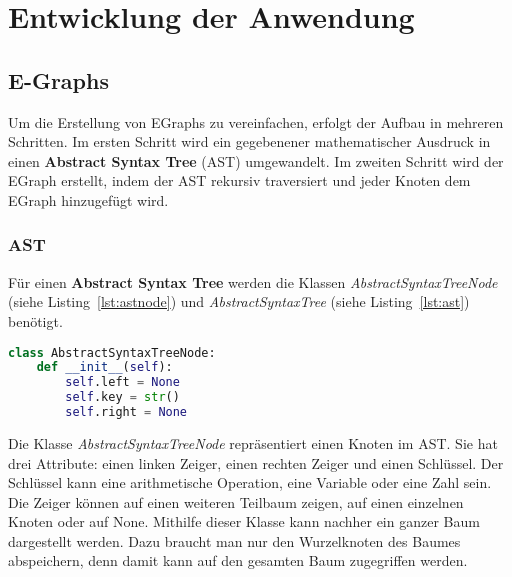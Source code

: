 \section{Entwicklung der Anwendung}\label{sec:entwicklung}

\subsection{E-Graphs}

Um die Erstellung von EGraphs zu vereinfachen, erfolgt der Aufbau in mehreren Schritten.
Im ersten Schritt wird ein gegebenener mathematischer Ausdruck in einen \textbf{Abstract Syntax Tree} (AST) umgewandelt.
Im zweiten Schritt wird der EGraph erstellt, indem der AST rekursiv traversiert und jeder Knoten dem EGraph hinzugefügt wird. 

\subsubsection{AST}

Für einen \textbf{Abstract Syntax Tree} werden die Klassen \textit{AbstractSyntaxTreeNode} (siehe Listing~\ref{lst:astnode}) und 
\textit{AbstractSyntaxTree} (siehe Listing~\ref{lst:ast}) benötigt.



\begin{lstlisting}[language=Python, caption=Klasse \textit{AbstractSyntaxTreeNode}, label={lst:astnode}]
class AbstractSyntaxTreeNode:
    def __init__(self):
        self.left = None
        self.key = str()
        self.right = None
\end{lstlisting}

Die Klasse \textit{AbstractSyntaxTreeNode} repräsentiert einen Knoten im AST. Sie hat drei Attribute: einen linken Zeiger, einen rechten Zeiger
und einen Schlüssel. Der Schlüssel kann eine arithmetische Operation, eine Variable oder eine Zahl sein. Die Zeiger können auf einen weiteren Teilbaum zeigen, auf einen einzelnen Knoten
oder auf None. Mithilfe dieser Klasse kann nachher ein ganzer Baum dargestellt werden. Dazu braucht man nur den Wurzelknoten des Baumes abspeichern, denn damit
kann auf den gesamten Baum zugegriffen werden. 

